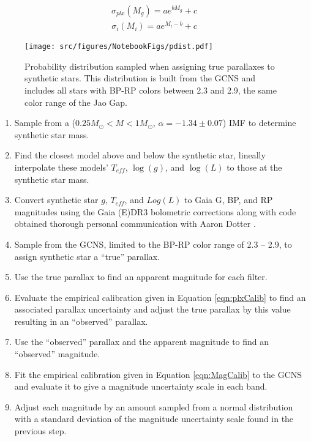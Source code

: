 \begin{align}\label{eqn:plxCalib}
	\sigma_{plx}(M_{g}) = ae^{bM_{g}}+c
\end{align}
\begin{align}\label{eqn:MagCalib}
	\sigma_{i}(M_{i}) = ae^{M_{i}-b}+c
\end{align}

\begin{figure}
	\centering
	\texttt{[image: src/figures/NotebookFigs/pdist.pdf]}
	\caption{Probability distribution sampled when assigning true parallaxes to
	synthetic stars. This distribution is built from the GCNS and includes all
	stars with BP-RP colors between 2.3 and 2.9, the same color range
	of the Jao Gap.}
	\label{fig:pdist}
\end{figure}

\begin{enumerate}
	\item Sample from a \citet{Sollima2019} ($0.25 M_{\odot} < M < 1 M_{\odot}$,
		$\alpha=-1.34\pm0.07$) IMF to determine synthetic star mass.
	\item Find the closest model above and below the synthetic star, lineally
		interpolate these models' $T_{eff}$, $\log(g)$, and $\log(L)$ to those
		at the synthetic star mass.
	\item Convert synthetic star $g$, $T_{eff}$, and $Log(L)$ to Gaia G, BP,
		and RP magnitudes using the Gaia (E)DR3 bolometric corrections
		\citep{Creevey2022} along with code obtained thorough personal
		communication with Aaron Dotter \citep{Choi2016}.
	\item Sample from the GCNS, limited to the BP-RP color range of
		2.3 -- 2.9, to assign synthetic star a ``true'' parallax.
	\item Use the true parallax to find an apparent magnitude for each filter.
	\item Evaluate the empirical calibration given in Equation
		\ref{eqn:plxCalib} to find an associated parallax uncertainty and
		adjust the true parallax by this value resulting in an ``observed''
		parallax.
	\item Use the ``observed'' parallax and the apparent magnitude to find an
		``observed'' magnitude.
	\item Fit the empirical calibration given in Equation \ref{eqn:MagCalib} to
		the GCNS and evaluate it to give a magnitude uncertainty scale in each
		band.
	\item Adjust each magnitude by an amount sampled from a normal
		distribution with a standard deviation of the magnitude uncertainty
		scale found in the previous step.
\end{enumerate}

